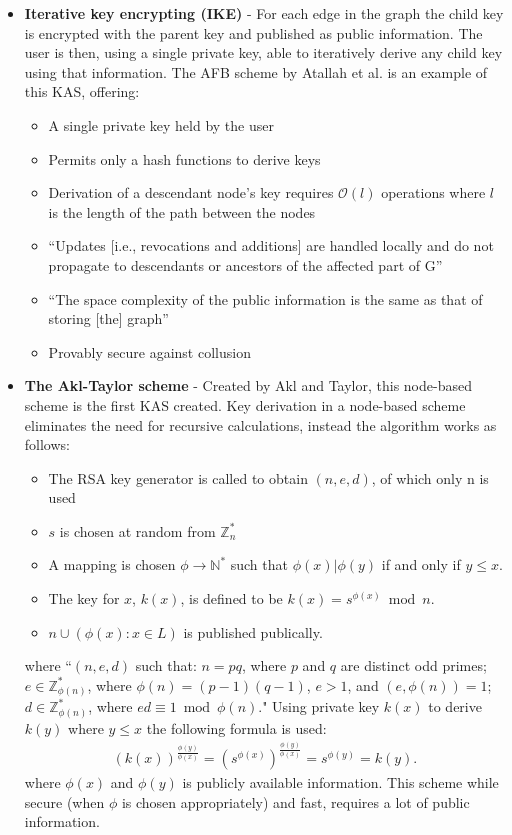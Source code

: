 \documentclass[12pt, titlepage]{article}
\begin{document}
\begin{itemize}
\item \textbf{Iterative key encrypting (IKE)} - For each edge in the graph the child key is encrypted with the parent key and published as public information. The user is then, using a single private key, able to iteratively derive any child key using that information.\cite{lazyEncryption} The AFB scheme by Atallah et al. is an example of this KAS, offering:\cite{atallah2005}
\begin{itemize}
\item A single private key held by the user
\item Permits only a hash functions to derive keys
\item Derivation of a descendant node's key requires $\mathcal{O}(l)$ operations where $l$ is the length of the path between the nodes
\item ``Updates [i.e., revocations and additions] are handled locally and do not propagate to descendants or ancestors of the affected part of G''
\item ``The space complexity of the public information is the same as that of
storing [the] graph''
\item Provably secure against collusion
\end{itemize}


\item \textbf{The Akl-Taylor scheme} - Created by Akl and Taylor, this node-based scheme is the first KAS created. Key derivation in a node-based scheme eliminates the need for recursive calculations, instead the algorithm works as follows:\cite{lazyEncryption}
\begin{itemize}
\item The RSA key generator is called to obtain $(n, e, d)$, of which only n is used
\item $s$ is chosen at random from $\mathbb{Z}^{*}_{n}$
\item A mapping is chosen $\phi \rightarrow \mathbb{N}^{*}$ such that $\phi(x) | \phi(y)$ if and only if $y≤x$.
\item The key for $x$, $k(x)$, is defined to be $k(x) = s^{ \phi (x)} \bmod n$.
\item ${n} \cup (\phi(x) : x ∈ L)$ is published publically.
\end{itemize}
where ``$(n, e, d)$ such that: $n = pq$, where $p$ and $q$ are distinct odd primes; $e ∈ \mathbb{Z}^{*}_{\phi(n)}$, where $\phi(n) = (p − 1)(q − 1)$, $e > 1$, and $(e, \phi(n)) = 1$; $d ∈ \mathbb{Z}^{*}_{\phi(n)}$, where $ed \equiv 1 \bmod \phi(n)$."
\newline Using private key $k(x)$ to derive $k(y)$ where $y≤x$ the following formula is used:
\begin{align*}
(k(x))^{\frac{\phi(y)}{\phi(x)}} = (s^{\phi(x)})^{\frac{\phi(y)}{\phi(x)}} = s^{\phi(y)} = k(y).
\end{align*}
where $\phi(x)$ and $\phi(y)$ is publicly available information.
\newline \indent This scheme while secure (when $\phi$ is chosen appropriately) and fast, requires a lot of public information.
\end{itemize}
\end{document}

